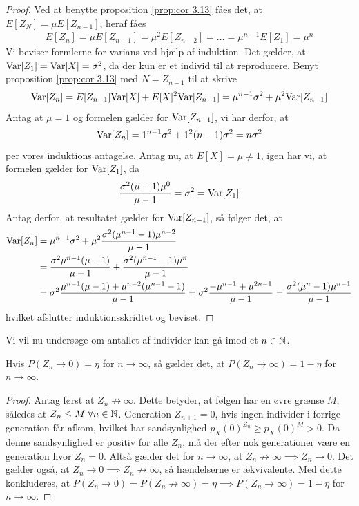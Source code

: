 \begin{proof}
Ved at benytte proposition \ref{prop:cor 3.13} fåes det, at $E[Z_N]=\mu E[Z_{n - 1}]$, heraf fåes
\begin{align*}
    E[Z_n]=\mu E[Z_{n - 1}]=\mu^2E[Z_{n-2}]= \dots = \mu^{n - 1} E[Z_1] = \mu^n
\end{align*}
Vi beviser formlerne for varians ved hjælp af induktion. 
Det gælder, at $\textnormal{Var}[Z_1] = \textnormal{Var}[X] = \sigma^2$, da der kun er et individ til at reproducere.
Benyt proposition \ref{prop:cor 3.13} med $N = Z_{n- 1}$ til at skrive
\begin{align*}
    \textnormal{Var}[Z_n] = E[Z_{n - 1}]\textnormal{Var}[X] + E[X]^2\textnormal{Var}[Z_{n - 1}]  = \mu^{n - 1}\sigma^2 + \mu^2\textnormal{Var}[Z_{n - 1}]
\end{align*}
Antag at $\mu = 1$ og formelen gælder for $\textnormal{Var}[Z_{n - 1}]$, vi har derfor, at 
\begin{equation*}
 \textnormal{Var}[Z_n] = 1^{n-1}\sigma^2 + 1^2 (n - 1)\sigma^2 = n \sigma^2   
\end{equation*}
per vores induktions antagelse.
Antag nu, at $E[X] = \mu \neq 1$, igen har vi, at formelen gælder for $\textnormal{Var}[Z_1]$, da 
\begin{equation*}
    \frac{\sigma^2(\mu - 1)\mu^0}{\mu - 1} = \sigma^2 = \textnormal{Var}[Z_1]
\end{equation*}
Antag derfor, at resultatet gælder for $\textnormal{Var}[Z_{n - 1}]$, så følger det, at
\begin{align*}
    \textnormal{Var}[Z_n] &= \mu^{n - 1} \sigma^2 + \mu^2 \frac{\sigma^2(\mu^{n  - 1} -1)\mu^{n-2}}{\mu-1} \\
    &= \frac{\sigma^2\mu^{n - 1}(\mu - 1)}{\mu - 1} + \frac{\sigma^2(\mu^{n - 1}-1)\mu^{n}}{\mu-1} \\
    &= \sigma^2\frac{\mu^{n - 1}(\mu - 1) + \mu^{n - 2}(\mu^{n - 1} - 1)}{\mu - 1}
    = \sigma^2 \frac{-\mu^{n - 1} + \mu^{2n - 1}}{\mu - 1} = \frac{\sigma^2(\mu^n - 1)\mu^{n - 1}}{\mu - 1}
\end{align*}
hvilket afslutter induktionsskridtet og beviset.
\end{proof}
Vi vil nu undersøge om antallet af individer kan gå imod et $n \in \mathbb{N}$.

\begin{prop} %
Hvis $P(Z_n \to 0) = \eta$ for $n \to \infty$, så gælder det, at  $P(Z_n \to \infty) = 1 - \eta$ for $n \to \infty$.
\end{prop}
\begin{proof}
Antag først at $Z_n\not\to\infty$.
Dette betyder, at følgen har en øvre grænse $M$, således at $Z_n \leq M \; \forall n\in \mathbb{N}$.
Generation $Z_{n+1}=0$, hvis ingen individer i forrige generation får afkom, hvilket har sandsynlighed $p_X(0)^{Z_n}\geq p_X(0)^{M}>0$.
Da denne sandsynlighed er positiv for alle $Z_n$, må der efter nok generationer være en generation hvor $Z_n=0$.
Altså gælder det for $n \to \infty$, at $Z_n\not\to\infty\implies Z_n\to0$.
Det gælder også, at $Z_n\to0\implies Z_n\not\to\infty$, så hændelserne er ækvivalente. Med dette konkluderes, at $P(Z_n \to 0) = P(Z_n\not\to\infty) = \eta \implies P(Z_n\to\infty) = 1-\eta$ for $n \to \infty$.
\end{proof}
